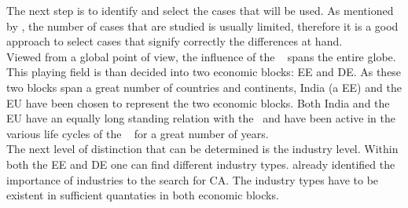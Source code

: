 The next step is to identify and select the cases that will be used. 
As mentioned by \cite{Pettigrew:1990}, the number of cases that are studied is usually limited, therefore it is a good approach to select cases that signify correctly the differences at hand.\\
Viewed from a global point of view, the influence of the  \wto~ spans the entire globe. This playing field is than decided into two economic blocks: \gls{EE} and \gls{DE}. As these two blocks span a great number of countries and continents, India (a \gls{EE}) and the \gls{EU} have been chosen to represent the two economic blocks. Both India and the EU have an equally long standing relation with the \wto~and have been active in the various life cycles of the \wto~ for a great number of years.\\
The next level of distinction that can be determined is the industry level. Within both the EE and DE one can find different industry types. \cite{Porter:1980} already identified the importance of industries to the search for \gls{CA}. 
The industry types have to be existent in sufficient quantaties in both economic blocks.  


